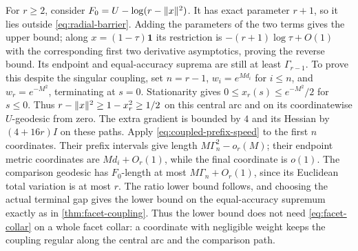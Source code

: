 \begin{example}
\label{ex:vertex-singular}
For $r\geq2$, consider $F_0=U-\log(r-\lVert x\rVert^2)$. It has exact
parameter $r+1$, so it lies outside \eqref{eq:radial-barrier}.
Adding the parameters of the two terms gives the upper bound; along $x=(1-\tau)\mathbf1$
its restriction is $-(r+1)\log\tau+O(1)$ with the corresponding
first two derivative asymptotics, proving the reverse bound.
Its endpoint and equal-accuracy suprema are still at least
$\Gamma_{r-1}$. To prove this despite the singular coupling,
set $n=r-1$, $w_i=e^{Md_i}$ for $i\leq n$, and
$w_r=e^{-M^2}$, terminating at $s=0$. Stationarity gives
$0\leq x_r(s)\leq e^{-M^2}/2$ for $s\leq0$.
Thus $r-\lVert x\rVert^2\geq1-x_r^2\geq1/2$ on this central arc
and on its coordinatewise $U$-geodesic from zero. The extra
gradient is bounded by $4$ and its Hessian by $(4+16r)I$ on
these paths. Apply \eqref{eq:coupled-prefix-speed} to the first
$n$ coordinates. Their prefix intervals give length
$M\Gamma_n^2-o_r(M)$; their endpoint metric coordinates are
$Md_i+O_r(1)$, while the final coordinate is $o(1)$.
The comparison geodesic has $F_0$-length at most
$M\Gamma_n+O_r(1)$, since its Euclidean total variation is at
most $r$. The ratio lower bound follows, and choosing the actual
terminal gap gives the lower bound on the equal-accuracy supremum
exactly as in
\cref{thm:facet-coupling}. Thus the lower bound does not need
\eqref{eq:facet-collar} on a whole facet collar: a coordinate with
negligible weight keeps the coupling regular along the central arc and
the comparison path.
\end{example}
